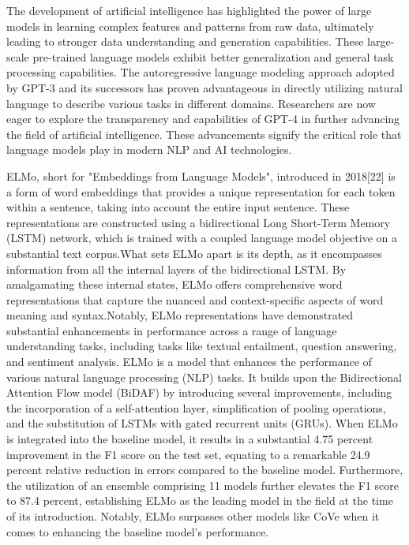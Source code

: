 \documentclass[conference]{IEEEtran}
\begin{document}
The development of artificial intelligence has highlighted the power of large models in learning complex features and patterns from raw data, ultimately leading to stronger data understanding and generation capabilities. These large-scale pre-trained language models exhibit better generalization and general task processing capabilities. The autoregressive language modeling approach adopted by GPT-3 and its successors has proven advantageous in directly utilizing natural language to describe various tasks in different domains. Researchers are now eager to explore the transparency and capabilities of GPT-4 in further advancing the field of artificial intelligence. These advancements signify the critical role that language models play in modern NLP and AI technologies.



ELMo, short for "Embeddings from Language Models", introduced in 2018[22] is a form of word embeddings that provides a unique representation for each token within a sentence, taking into account the entire input sentence. These representations are constructed using a bidirectional Long Short-Term Memory (LSTM) network, which is trained with a coupled language model objective on a substantial text corpus.What sets ELMo apart is its depth, as it encompasses information from all the internal layers of the bidirectional LSTM. By amalgamating these internal states, ELMo offers comprehensive word representations that capture the nuanced and context-specific aspects of word meaning and syntax.Notably, ELMo representations have demonstrated substantial enhancements in performance across a range of language understanding tasks, including tasks like textual entailment, question answering, and sentiment analysis.
ELMo is a model that enhances the performance of various natural language processing (NLP) tasks. It builds upon the Bidirectional Attention Flow model (BiDAF) by introducing several improvements, including the incorporation of a self-attention layer, simplification of pooling operations, and the substitution of LSTMs with gated recurrent units (GRUs). When ELMo is integrated into the baseline model, it results in a substantial 4.75 percent improvement in the F1 score on the test set, equating to a remarkable 24.9 percent relative reduction in errors compared to the baseline model. Furthermore, the utilization of an ensemble comprising 11 models further elevates the F1 score to 87.4 percent, establishing ELMo as the leading model in the field at the time of its introduction. Notably, ELMo surpasses other models like CoVe when it comes to enhancing the baseline model's performance.
\end{document}
